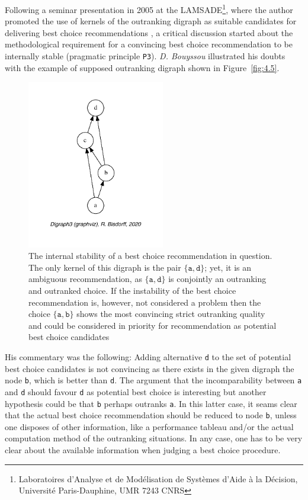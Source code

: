 Following a seminar presentation in 2005 at the LAMSADE\footnote{Laboratoires d'Analyse et de Modélisation de Systèmes d'Aide à la Décision, Université Paris-Dauphine, UMR 7243 CNRS}, where the author promoted the use of kernels of the outranking digraph as suitable candidates for delivering best choice recommendations \citep{BIS-2005}, a critical discussion started about the methodological requirement for a convincing best choice recommendation to be internally stable (pragmatic principle \texttt{P3}). \emph{D. Bouyssou} illustrated his doubts with the example of supposed outranking digraph shown in Figure~\vref{fig:4.5}.
\begin{figure}[ht]
\sidecaption[t]
\includegraphics[width=6cm]{Figures/4-5-bouyssou11Oct05crisp.pdf}
\caption{The internal stability of a best choice recommendation in question. The only kernel of this digraph is the pair $\{\mathtt{a},\mathtt{d}\}$; yet, it is an ambiguous recommendation, as $\{\mathtt{a},\mathtt{d}\}$ is conjointly an outranking and outranked choice. If the instability of the best choice recommendation is, however, not considered a problem then the choice $\{\mathtt{a},\mathtt{b}\}$ shows the most convincing strict outranking quality and could be considered in priority for recommendation as potential best choice candidates}
\label{fig:4.5}       %
\end{figure}

His commentary was the following: Adding alternative \texttt{d} to the set of potential best choice candidates is not convincing as there exists in the given digraph the node \texttt{b}, which is better than \texttt{d}. The argument that the incomparability between \texttt{a} and \texttt{d} should favour \texttt{d} as potential best choice is interesting but another hypothesis could be that \texttt{b} perhaps outranks \texttt{a}. In this latter case, it seams clear that the actual best choice recommendation should be reduced to node \texttt{b}, unless one disposes of other information, like a performance tableau and/or the actual computation method of the outranking situations. In any case, one has to be very clear about the available information when judging a best choice procedure.

